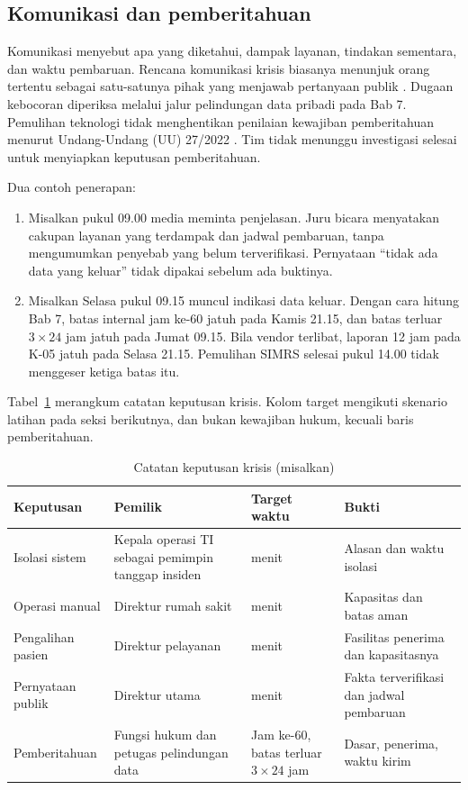 \subsection*{Komunikasi dan pemberitahuan}

Komunikasi menyebut apa yang diketahui, dampak layanan, tindakan sementara, dan waktu pembaruan.
Rencana komunikasi krisis biasanya menunjuk orang tertentu sebagai satu-satunya pihak yang menjawab
pertanyaan publik \cite{c10-nist80034}. Dugaan kebocoran diperiksa melalui jalur pelindungan data
pribadi pada Bab 7. Pemulihan teknologi tidak menghentikan penilaian kewajiban pemberitahuan menurut
Undang-Undang (UU) 27/2022 \cite{uu27-2022-pdp}. Tim tidak menunggu investigasi selesai untuk
menyiapkan keputusan pemberitahuan.

Dua contoh penerapan:
\begin{enumerate}
  \item Misalkan pukul 09.00 media meminta penjelasan. Juru bicara menyatakan cakupan layanan yang
  terdampak dan jadwal pembaruan, tanpa mengumumkan penyebab yang belum terverifikasi. Pernyataan
  ``tidak ada data yang keluar'' tidak dipakai sebelum ada buktinya.
  \item Misalkan Selasa pukul 09.15 muncul indikasi data keluar. Dengan cara hitung Bab 7, batas
  internal jam ke-60 jatuh pada Kamis 21.15, dan batas terluar $3 \times 24$ jam jatuh pada Jumat
  09.15. Bila vendor terlibat, laporan 12 jam pada K-05 jatuh pada Selasa 21.15. Pemulihan SIMRS
  selesai pukul 14.00 tidak menggeser ketiga batas itu.
\end{enumerate}

Tabel~\ref{tab:ch10-krisis} merangkum catatan keputusan krisis. Kolom target mengikuti skenario
latihan pada seksi berikutnya, dan bukan kewajiban hukum, kecuali baris pemberitahuan.

\begin{table}[!htb]
  \centering\small
  \caption{Catatan keputusan krisis (misalkan)}\label{tab:ch10-krisis}
  \begin{tabularx}{\textwidth}{|>{\raggedright\arraybackslash}X|>{\raggedright\arraybackslash}X|>{\raggedright\arraybackslash}p{}|>{\raggedright\arraybackslash}X|}
    \hline
    \textbf{Keputusan} & \textbf{Pemilik} & \textbf{Target waktu} & \textbf{Bukti} \\ \hline
    Isolasi sistem & Kepala operasi TI sebagai pemimpin tanggap insiden & 15 menit & Alasan dan
    waktu isolasi \\ \hline
    Operasi manual & Direktur rumah sakit & 20 menit & Kapasitas dan batas aman \\ \hline
    Pengalihan pasien & Direktur pelayanan & 30 menit & Fasilitas penerima dan kapasitasnya \\
    \hline
    Pernyataan publik & Direktur utama & 60 menit & Fakta terverifikasi dan jadwal pembaruan \\
    \hline
    Pemberitahuan & Fungsi hukum dan petugas pelindungan data & Jam ke-60, batas terluar $3
    \times 24$ jam & Dasar, penerima, waktu kirim \\ \hline
  \end{tabularx}
\end{table}

